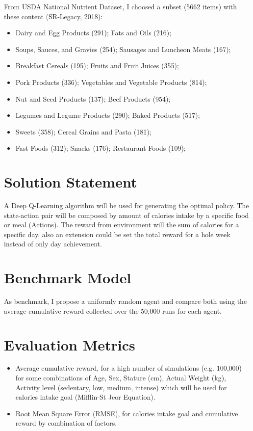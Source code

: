 \documentclass{article}
\begin{document}
From USDA National Nutrient Dataset, I choosed a subset (5662 items) with these content (SR-Legacy, 2018):

\begin{itemize}
    \item Dairy and Egg Products (291); Fats and Oils (216);
    \item Soups, Sauces, and Gravies (254); Sausages and Luncheon Meats (167);
    \item Breakfast Cereals (195); Fruits and Fruit Juices (355);
    \item Pork Products (336); Vegetables and Vegetable Products (814);
    \item Nut and Seed Products (137); Beef Products (954);
    \item Legumes and Legume Products (290); Baked Products (517);
    \item Sweets (358); Cereal Grains and Pasta (181);
    \item Fast Foods (312); Snacks (176); Restaurant Foods (109);
\end{itemize}

\section{Solution Statement}

A Deep Q-Learning algorithm will be used for generating the optimal policy. The state-action pair 
will be composed by amount of calories intake by a specific food or meal (Actions). The reward from 
environment will the sum of calories for a specific day, also an extension could be set the total 
reward for a hole week instead of only day achievement.

\section{Benchmark Model}

As benchmark, I propose a uniformly random agent and compare both using the average cumulative 
reward collected over the 50,000 runs for each agent.

\section{Evaluation Metrics}

\begin{itemize}
    \item Average cumulative reward, for a high number of simulations (e.g. 100,000) for 
    some combinations of Age, Sex, Stature (cm), Actual Weight (kg), Activity level 
    (sedentary, low, medium, intense) which will be used for calories intake goal 
    (Mifflin-St Jeor Equation).
    \item Root Mean Square Error (RMSE), for calories intake goal and cumulative 
    reward by combination of factors.
\end{itemize}
\end{document}
